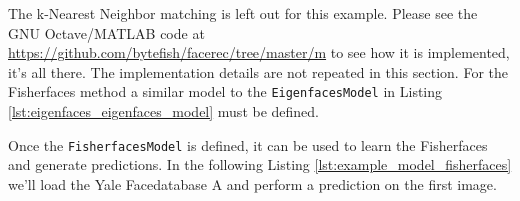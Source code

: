 \ifx\python\undefined
	The k-Nearest Neighbor matching is left out for this example. Please see the GNU Octave/MATLAB code at \url{https://github.com/bytefish/facerec/tree/master/m} to see how it is implemented, it's all there.
\else
	The implementation details are not repeated in this section. For the Fisherfaces method a similar model to the \lstinline|EigenfacesModel| in Listing \ref{lst:eigenfaces_eigenfaces_model} must be defined.
		
	
	
		Once the \lstinline|FisherfacesModel| is defined, it can be used to learn the Fisherfaces and generate predictions. In the following Listing \ref{lst:example_model_fisherfaces} we'll load the Yale Facedatabase A and perform a prediction on the first image.
		
	

\fi


